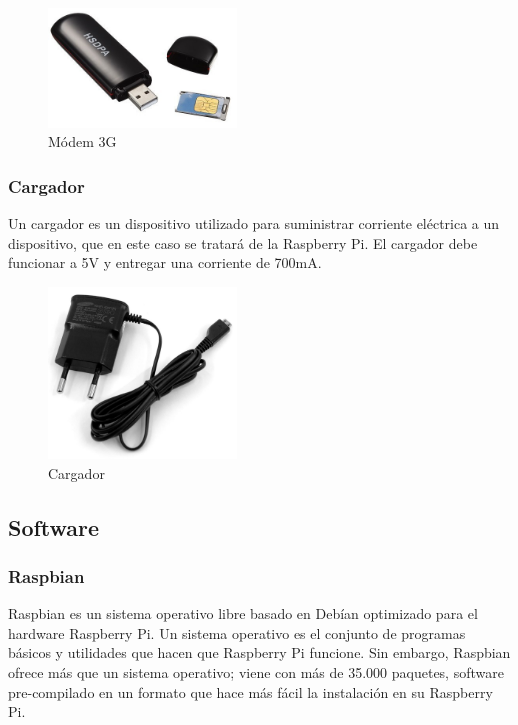 \documentclass[11pt,letterpaper]{article}
\begin{document}
\begin{figure}[ht!]
\caption{Módem 3G}
\centering
\includegraphics[width=5cm]{modem}
\end{figure}

\newpage

\subsubsection{Cargador}

Un cargador es un dispositivo utilizado para suministrar corriente eléctrica a un dispositivo, que en este caso se tratará de la Raspberry Pi. El cargador debe funcionar a 5V y entregar una corriente de 700mA.

\begin{figure}[ht!]
\caption{Cargador}
\centering
\includegraphics[width=5cm]{cargador}
\end{figure}

\newpage


\subsection{Software}

\subsubsection{Raspbian}

Raspbian\citep{raspbian} es un sistema operativo libre basado en Debían optimizado para el hardware Raspberry Pi. Un sistema operativo es el conjunto de programas básicos y utilidades que hacen que Raspberry Pi funcione. Sin embargo, Raspbian ofrece más que un sistema operativo; viene con más de 35.000 paquetes, software pre-compilado en un formato que hace más fácil la instalación en su Raspberry Pi.
\end{document}
